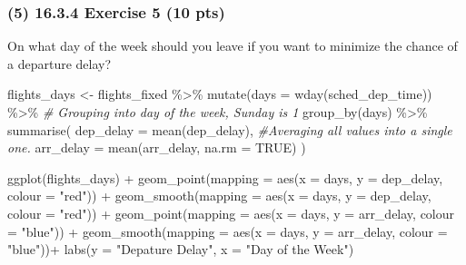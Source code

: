 \documentclass[
]{article}
\newenvironment{Shaded}{\begin{snugshade}}{\end{snugshade}}
\newcommand{\AttributeTok}[1]{\textcolor[rgb]{0.77,0.63,0.00}{#1}}
\newcommand{\CommentTok}[1]{\textcolor[rgb]{0.56,0.35,0.01}{\textit{#1}}}
\newcommand{\ConstantTok}[1]{\textcolor[rgb]{0.00,0.00,0.00}{#1}}
\newcommand{\FunctionTok}[1]{\textcolor[rgb]{0.00,0.00,0.00}{#1}}
\newcommand{\NormalTok}[1]{#1}
\newcommand{\OtherTok}[1]{\textcolor[rgb]{0.56,0.35,0.01}{#1}}
\newcommand{\SpecialCharTok}[1]{\textcolor[rgb]{0.00,0.00,0.00}{#1}}
\newcommand{\StringTok}[1]{\textcolor[rgb]{0.31,0.60,0.02}{#1}}
\begin{document}
\hypertarget{exercise-5-10-pts}{%
\subsubsection{(5) 16.3.4 Exercise 5 (10 pts)}\label{exercise-5-10-pts}}

On what day of the week should you leave if you want to minimize the
chance of a departure delay?

\begin{Shaded}
\begin{Highlighting}[]
\NormalTok{flights\_days }\OtherTok{\textless{}{-}}\NormalTok{ flights\_fixed }\SpecialCharTok{\%\textgreater{}\%}
  \FunctionTok{mutate}\NormalTok{(}\AttributeTok{days =} \FunctionTok{wday}\NormalTok{(sched\_dep\_time)) }\SpecialCharTok{\%\textgreater{}\%} \CommentTok{\# Grouping into day of the week, Sunday is 1}
  \FunctionTok{group\_by}\NormalTok{(days) }\SpecialCharTok{\%\textgreater{}\%}
  \FunctionTok{summarise}\NormalTok{(}
    \AttributeTok{dep\_delay =} \FunctionTok{mean}\NormalTok{(dep\_delay), }\CommentTok{\#Averaging all values into a single one.}
    \AttributeTok{arr\_delay =} \FunctionTok{mean}\NormalTok{(arr\_delay, }\AttributeTok{na.rm =} \ConstantTok{TRUE}\NormalTok{)}
\NormalTok{  ) }


  
\FunctionTok{ggplot}\NormalTok{(flights\_days) }\SpecialCharTok{+}
  \FunctionTok{geom\_point}\NormalTok{(}\AttributeTok{mapping =} \FunctionTok{aes}\NormalTok{(}\AttributeTok{x =}\NormalTok{ days, }\AttributeTok{y =}\NormalTok{ dep\_delay, }\AttributeTok{colour =} \StringTok{"red"}\NormalTok{)) }\SpecialCharTok{+}
  \FunctionTok{geom\_smooth}\NormalTok{(}\AttributeTok{mapping =} \FunctionTok{aes}\NormalTok{(}\AttributeTok{x =}\NormalTok{ days, }\AttributeTok{y =}\NormalTok{ dep\_delay, }\AttributeTok{colour =} \StringTok{"red"}\NormalTok{)) }\SpecialCharTok{+}
  \FunctionTok{geom\_point}\NormalTok{(}\AttributeTok{mapping =} \FunctionTok{aes}\NormalTok{(}\AttributeTok{x =}\NormalTok{ days, }\AttributeTok{y =}\NormalTok{ arr\_delay, }\AttributeTok{colour =} \StringTok{"blue"}\NormalTok{)) }\SpecialCharTok{+}
  \FunctionTok{geom\_smooth}\NormalTok{(}\AttributeTok{mapping =} \FunctionTok{aes}\NormalTok{(}\AttributeTok{x =}\NormalTok{ days, }\AttributeTok{y =}\NormalTok{ arr\_delay, }\AttributeTok{colour =} \StringTok{"blue"}\NormalTok{))}\SpecialCharTok{+}
  \FunctionTok{labs}\NormalTok{(}\AttributeTok{y =} \StringTok{"Depature Delay"}\NormalTok{, }\AttributeTok{x =} \StringTok{"Day of the Week"}\NormalTok{)}
\end{Highlighting}
\end{Shaded}
\end{document}
